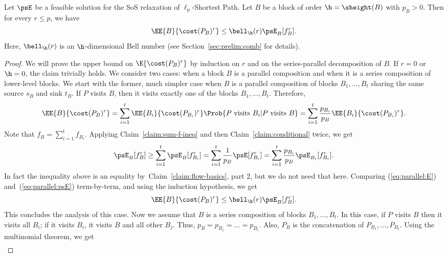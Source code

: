 \documentclass[11pt,a4paper]{article}
\begin{document}
\begin{lemma}\label{lem:cost-analysis}
Let $\psE$ be a feasible solution for the SoS relaxation of $\ell_p$-Shortest Path. Let $B$ be a block of order $\h=\sheight(B)$ with $p_B > 0$. Then for every $r\leq p$, we have
$$
\EE{B}{\cost(P_B)^{r}} 
\leq \bell_\h(r) \psE_B[f_B^{r}] .
$$
Here, $\bell_{\h}(r)$ is an $\h$-dimensional Bell number (see Section~\ref{sec:prelim:comb} for details).
\end{lemma}
\begin{proof}
We will prove the upper bound on $\E{\cost(P_B)^r}$ by induction on \(r\) and on the series-parallel decomposition of $B$. 
If $r=0$ or $\h=0$, the claim trivially holds.
We consider two cases: when a block $B$ is a parallel composition and when it is a series composition of lower-level blocks. We start with the former, much simpler case when $B$ is a parallel composition of blocks $B_1,\dots, B_t$ sharing the same source $s_B$ and sink $t_B$. If $P$ visits $B$, then it visits exactly one of the blocks $B_1, \dots, B_t$. Therefore,
\begin{equation}\label{eq:parallel:E}
\EE{B}{\cost(P_B)^r} = \sum_{i=1}^t\EE{B_i}{\cost(P_{B_i})^r} \Prob{P \text{ visits } B_i | P \text{ visits } B} = \sum_{i=1}^t\frac{p_{B_i}}{p_B}\EE{B_i}{\cost(P_{B_i})^r}. 
\end{equation}
Note that $f_B = \sum_{i=1}^t f_{B_i}$. Applying Claim~\ref{claim:sum-f-ineq} and then Claim~\ref{claim:conditional} twice, we get 
\begin{equation}\label{eq:parallel:psE}
\psE_B[f_B^r] \geq \sum_{i=1}^t\psE_B[f_{B_i}^r] = 
\sum_{i=1}^t\frac{1}{p_B}\psE[f_{B_i}^r] = 
\sum_{i=1}^t\frac{p_{B_i}}{p_B}\psE_{B_i}[f_{B_i}^r].
\end{equation}
In fact the inequality above is an equality by~Claim~\ref{claim:flow-basics}, part 2, but we do not need that here.
Comparing (\ref{eq:parallel:E}) and~(\ref{eq:parallel:psE}) term-by-term, and using the induction hypothesis, we get
$$\EE{B}{\cost(P_{B})^r} \leq \bell_\h(r) \psE_{B}[f_{B}^r].$$
This concludes the analysis of this case.
%
Now we assume that $B$ is a series composition of blocks $B_1,\dots, B_t$.
In this case, if $P$ visits $B$ then it visits all $B_i$; if it visits $B_i$, it visits $B$ and all other $B_j$. Thus, $p_B = p_{B_1} = \dots = p_{B_t}$. Also, $P_B$ is the concatenation of $P_{B_1}, \dots, P_{B_t}$.
Using the multinomial theorem, we get
\begin{align}

\end{align}
\end{proof}
\end{document}
